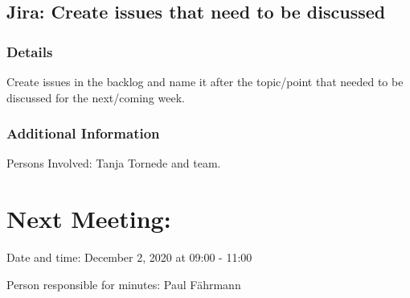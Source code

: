 \documentclass[11pt]{meetingmins} %
\begin{document}
\subsection{Jira: Create issues that need to be discussed}
    \subsubsection{Details}
        \begin{hiddensubitems}
            \item
                Create issues in the backlog and name it after the topic/point that needed to be discussed for the next/coming week.
        \end{hiddensubitems}
        
    \subsubsection{Additional Information}
        \begin{hiddensubitems}
            \item
                Persons Involved: Tanja Tornede and team.
        \end{hiddensubitems}
    
\section{Next Meeting:}
    \begin{hiddensubitems}
        \item
            Date and time: December 2, 2020 at 09:00 - 11:00
        \item
            Person responsible for minutes: Paul Fährmann
    \end{hiddensubitems}
\end{document}
